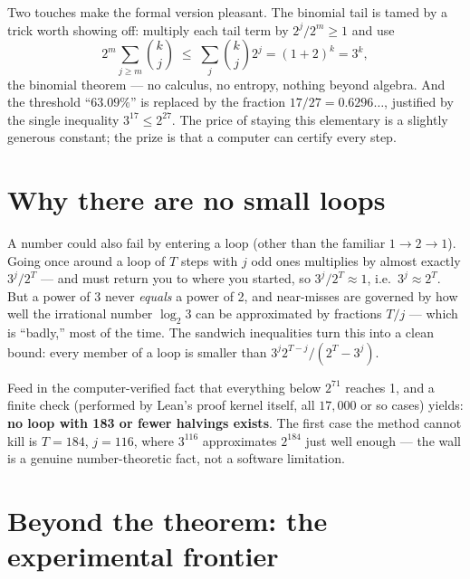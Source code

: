 \documentclass[11pt]{article}
\begin{document}
Two touches make the formal version pleasant. The binomial tail is
tamed by a trick worth showing off: multiply each tail term by
$2^{j}/2^{m} \geq 1$ and use
\[
2^m \sum_{j \ge m} \binom{k}{j} \;\le\; \sum_{j} \binom{k}{j} 2^j
= (1+2)^k = 3^k,
\]
the binomial theorem --- no calculus, no entropy, nothing beyond
algebra. And the threshold ``$63.09\%$'' is replaced by the fraction
$17/27 = 0.6296\ldots$, justified by the single inequality
$3^{17} \le 2^{27}$. The price of staying this elementary is a slightly
generous constant; the prize is that a computer can certify every step.

\section{Why there are no small loops}

A number could also fail by entering a loop (other than the familiar
$1 \to 2 \to 1$). Going once around a loop of $T$ steps with $j$ odd
ones multiplies by almost exactly $3^j/2^T$ --- and must return you to
where you started, so $3^j/2^T \approx 1$, i.e.\ $3^j \approx 2^T$. But
a power of 3 never \emph{equals} a power of 2, and near-misses are
governed by how well the irrational number $\log_2 3$ can be
approximated by fractions $T/j$ --- which is ``badly,'' most of the
time. The sandwich inequalities turn this into a clean bound: every
member of a loop is smaller than $3^j 2^{T-j} / (2^T - 3^j)$.

Feed in the computer-verified fact that everything below $2^{71}$
reaches 1, and a finite check (performed by Lean's proof kernel itself,
all $17{,}000$ or so cases) yields: \textbf{no loop with 183 or fewer
halvings exists}. The first case the method cannot kill is $T = 184$,
$j = 116$, where $3^{116}$ approximates $2^{184}$ just well enough ---
the wall is a genuine number-theoretic fact, not a software limitation.

\section{Beyond the theorem: the experimental frontier}
\end{document}
